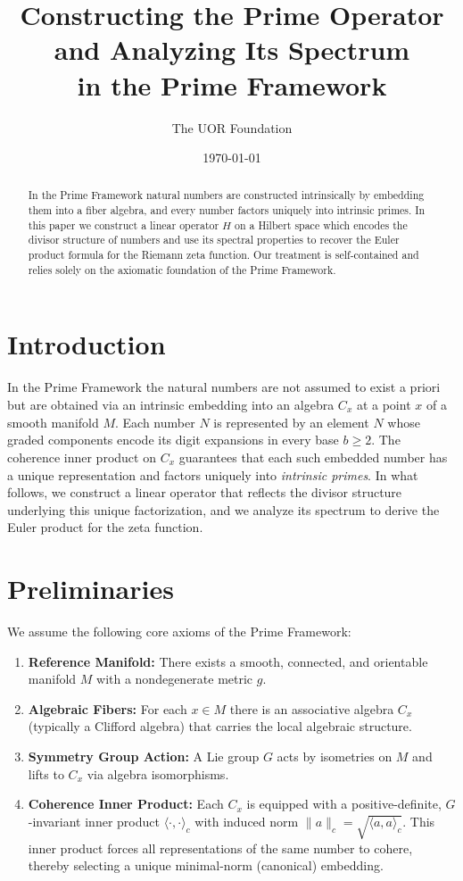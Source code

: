 \documentclass{article}
\begin{document}
\title{Constructing the Prime Operator and Analyzing Its Spectrum\\ in the Prime Framework}
\author{The UOR Foundation}
\date{\today}
\maketitle

\begin{abstract}
  In the Prime Framework natural numbers are constructed intrinsically by embedding them into a fiber algebra, and every number factors uniquely into intrinsic primes. In this paper we construct a linear operator \(H\) on a Hilbert space which encodes the divisor structure of numbers and use its spectral properties to recover the Euler product formula for the Riemann zeta function. Our treatment is self-contained and relies solely on the axiomatic foundation of the Prime Framework.
\end{abstract}

\section{Introduction}
In the Prime Framework the natural numbers are not assumed to exist a priori but are obtained via an intrinsic embedding into an algebra \(C_x\) at a point \(x\) of a smooth manifold \(M\). Each number \(N\) is represented by an element \(\widehat{N}\) whose graded components encode its digit expansions in every base \(b\ge2\). The coherence inner product on \(C_x\) guarantees that each such embedded number has a unique representation and factors uniquely into \emph{intrinsic primes}. In what follows, we construct a linear operator that reflects the divisor structure underlying this unique factorization, and we analyze its spectrum to derive the Euler product for the zeta function.

\section{Preliminaries}
We assume the following core axioms of the Prime Framework:
\begin{enumerate}[label=\textbf{Axiom \arabic*:},leftmargin=2cm]
  \item \textbf{Reference Manifold:} There exists a smooth, connected, and orientable manifold \(M\) with a nondegenerate metric \(g\).
  \item \textbf{Algebraic Fibers:} For each \(x\in M\) there is an associative algebra \(C_x\) (typically a Clifford algebra) that carries the local algebraic structure.
  \item \textbf{Symmetry Group Action:} A Lie group \(G\) acts by isometries on \(M\) and lifts to \(C_x\) via algebra isomorphisms.
  \item \textbf{Coherence Inner Product:} Each \(C_x\) is equipped with a positive-definite, \(G\)-invariant inner product \(\langle \cdot,\cdot \rangle_c\) with induced norm \(\|a\|_c=\sqrt{\langle a,a\rangle_c}\). This inner product forces all representations of the same number to cohere, thereby selecting a unique minimal-norm (canonical) embedding.
\end{enumerate}
\end{document}
